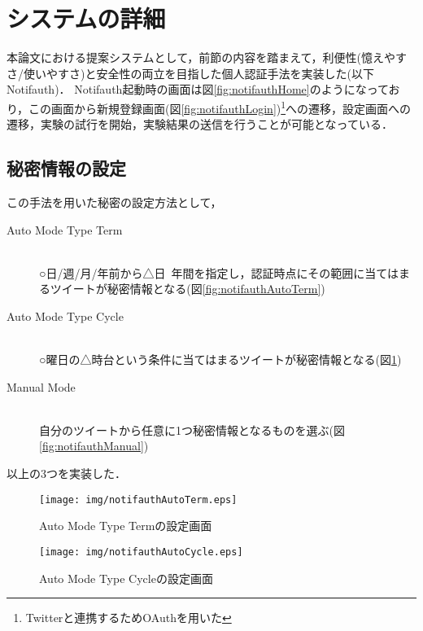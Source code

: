 \section{システムの詳細}
本論文における提案システムとして，前節の内容を踏まえて，利便性(憶えやすさ/使いやすさ)と安全性の両立を目指した個人認証手法を実装した(以下Notifauth)．
Notifauth起動時の画面は図\ref{fig:notifauthHome}のようになっており，この画面から新規登録画面(図\ref{fig:notifauthLogin})\footnote{Twitterと連携するためOAuthを用いた}への遷移，設定画面への遷移，実験の試行を開始，実験結果の送信を行うことが可能となっている．

\subsection{秘密情報の設定}\label{subsec:selectSecret}
この手法を用いた秘密の設定方法として，
\begin{description}
  \item[Auto Mode Type Term]\mbox{}\\
    ○日/週/月/年前から△日~年間を指定し，認証時点にその範囲に当てはまるツイートが秘密情報となる(図\ref{fig:notifauthAutoTerm})
  \item[Auto Mode Type Cycle]\mbox{}\\
    ○曜日の△時台という条件に当てはまるツイートが秘密情報となる(図\ref{fig:notifauthAutoCycle})
  \item[Manual Mode]\mbox{}\\
    自分のツイートから任意に1つ秘密情報となるものを選ぶ(図\ref{fig:notifauthManual})
\end{description}
以上の3つを実装した．

\begin{figure}[ht]
  \begin{minipage}{0.5\hsize}
    \begin{center}
      \texttt{[image: img/notifauthAutoTerm.eps]}
    \end{center}
    \caption{Auto Mode Type Termの設定画面}
    \label{fig:notifauthAutoTerm}
  \end{minipage}
  \begin{minipage}{0.5\hsize}
    \begin{center}
      \texttt{[image: img/notifauthAutoCycle.eps]}
    \end{center}
    \caption{Auto Mode Type Cycleの設定画面}
    \label{fig:notifauthAutoCycle}
  \end{minipage}
\end{figure}


